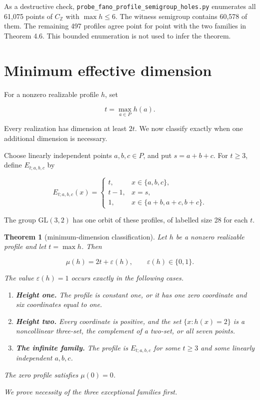 \documentclass[11pt]{article}
\newtheorem{theorem}{Theorem}[section]
\theoremstyle{remark}
\numberwithin{equation}{section}
\begin{document}
As a destructive check, \nolinkurl{probe_fano_profile_semigroup_holes.py} enumerates all
61,075 points of $C_{\mathbb Z}$ with $\max h\le6$. The witness semigroup
contains 60,578 of them. The remaining 497 profiles agree point for point with
the two families in Theorem 4.6. This bounded enumeration is not used to infer
the theorem.

\section{Minimum effective dimension}


For a nonzero realizable profile $h$, set

\nopagebreak[4]
\[
t=\max_{a\in P}h(a).
\tag{5.1}
\]

Every realization has dimension at least $2t$. We now classify exactly when
one additional dimension is necessary.

Choose linearly independent points $a,b,c\in P$, and put
$s=a+b+c$. For $t\ge3$, define $E_{t;a,b,c}$ by

\nopagebreak[4]
\[
E_{t;a,b,c}(x)=
\begin{cases}
t,&x\in\{a,b,c\},\\
t-1,&x=s,\\
1,&x\in\{a+b,a+c,b+c\}.
\end{cases}
\tag{5.2}
\]

The group $\mathrm{GL}(3,2)$ has one orbit of these profiles, of labelled size
28 for each $t$.

\Needspace{0.28\textheight}
\begin{theorem}[minimum-dimension classification]

Let $h$ be a nonzero realizable profile and let $t=\max h$. Then

\nopagebreak[4]
\[
\mu(h)=2t+\varepsilon(h),
\qquad \varepsilon(h)\in\{0,1\}.
\tag{5.3}
\]

The value $\varepsilon(h)=1$ occurs exactly in the following cases.

\begin{enumerate}
\item \textbf{Height one.} The profile is constant one, or it has one zero coordinate
   and six coordinates equal to one.
\item \textbf{Height two.} Every coordinate is positive, and the set
   $\{x:h(x)=2\}$ is a noncollinear three-set, the complement of a two-set, or
   all seven points.
\item \textbf{The infinite family.} The profile is $E_{t;a,b,c}$ for some $t\ge3$ and
   some linearly independent $a,b,c$.

\end{enumerate}

The zero profile satisfies $\mu(0)=0$.

We prove necessity of the three exceptional families first.

\end{theorem}
\end{document}
